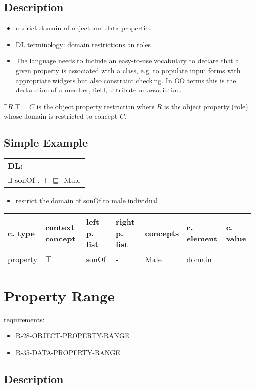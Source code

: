 \documentclass{llncs}
\newenvironment{gcotable}{
  \scriptsize
  \sffamily
  \vspace{0.3cm}
  \begin{tabular}{l|l|l|l|l|l|l}
  \hline
  \textbf{c. type} & \textbf{context concept} & \textbf{left p. list} & \textbf{right p. list} & \textbf{concepts} & \textbf{c. element} & \textbf{c. value} \\
  \hline

}{
  \hline
  \end{tabular}
  \linebreak
}
\newenvironment{DL}{
  \scriptsize
  \sffamily
  \vspace{0.3cm}
  \begin{tabular}{l}
	\textbf{DL:} \\

}{
  \end{tabular}
  \linebreak
}
\begin{document}
\subsection{Description}

\begin{itemize}
	\item restrict domain of object and data properties
	\item DL terminology: domain restrictions on roles
	\item The language needs to include an easy-to-use vocabulary to declare that a given property is associated with a class, e.g. to populate input forms with appropriate widgets but also constraint checking. In OO terms this is the declaration of a member, field, attribute or association. 
\end{itemize}

$\exists R. \top \sqsubseteq C$ is the object property restriction where $R$ is the object property (role) whose domain is restricted to concept $C$.

\subsection{Simple Example}

\begin{DL}
$\exists$ sonOf . $\top$ $\sqsubseteq$ Male 
\end{DL}

\begin{itemize}
	\item restrict the domain of sonOf to male individual
\end{itemize}

\begin{gcotable}
property & $\top$ & sonOf & - & Male & domain \\
\end{gcotable}

\section{Property Range}

requirements:

\begin{itemize}
	\item R-28-OBJECT-PROPERTY-RANGE
	\item R-35-DATA-PROPERTY-RANGE
\end{itemize}

\subsection{Description}
\end{document}

